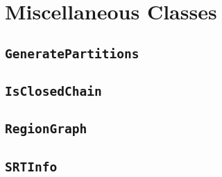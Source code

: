 \section{Miscellaneous Classes}

\subsection{\texttt{GeneratePartitions}}

\subsection{\texttt{IsClosedChain}}

\subsection{\texttt{RegionGraph}}

\subsection{\texttt{SRTInfo}}

